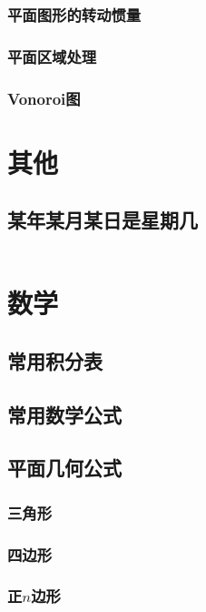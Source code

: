 \documentclass[a4paper]{article}
\newcommand{\cppcode}[1]{
    \inputminted[mathescape]{cpp}{source/#1}
}
\begin{document}
\subsubsection{平面图形的转动惯量}

\subsubsection{平面区域处理}

\subsubsection{Vonoroi图}

\section{其他}

\subsection{某年某月某日是星期几}

\cppcode{miscellany/what-day-is-today.cpp}

\section{数学}

\subsection{常用积分表}

\subsection{常用数学公式}

\subsection{平面几何公式}

\subsubsection{三角形}

\subsubsection{四边形}

\subsubsection{正$n$边形}
\end{document}
